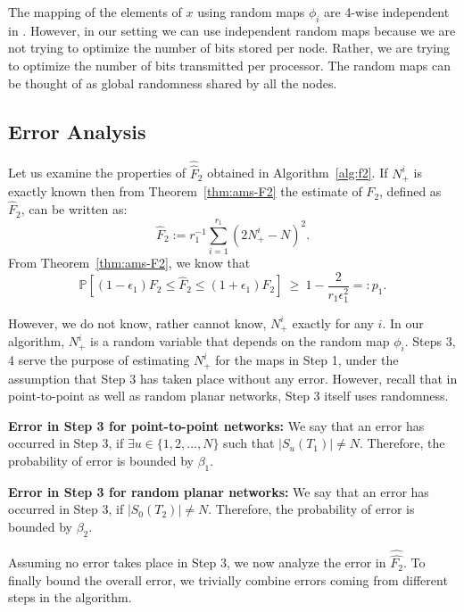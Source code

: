 \documentclass[10pt,twosided,a4paper,draft,onecolumn]{article}
\newcommand{\prob}[1]{\mathbb{P}\left[ #1 \right]}
\begin{document}
The mapping of the elements of $x$ using random maps $\phi_i$ are
4-wise independent in \cite{Alon96}. However, in our setting we can
use independent random maps because we are not trying to optimize the
number of bits stored per node. Rather, we are trying to optimize the
number of bits transmitted per processor. The random maps can be
thought of as global randomness shared by all the nodes.

\subsection{Error Analysis}
\label{sec:err-analysis}

Let us examine the properties of $\hat{\hat{F}}_2$ obtained in
Algorithm~\ref{alg:f2}. If $N_+^i$ is exactly known then
from Theorem~\ref{thm:ams-F2} the estimate of $F_2$, defined as
$\hat{F}_2$, can be written as:
\begin{displaymath}
  \hat{F}_2 := r_1^{-1} \sum\limits_{i=1}^{r_1} \left( 2N_{+}^i - N \right)^2.
\end{displaymath}
From Theorem~\ref{thm:ams-F2}, we know that 
\begin{equation}
  \label{eq:p1}
  \prob{(1-\epsilon_1)F_2 \leq \hat{F}_2 \leq (1+\epsilon_1)F_2}
  \ \geq \ 1-\frac{2}{r_1\epsilon_1^2} =: p_1.
\end{equation}


However, we do not know, rather cannot know, $N_+^i$ exactly for any
$i$. In our algorithm, $N_+^i$ is a random variable that depends on
the random map $\phi_i$. Steps 3, 4 serve the purpose of estimating
$N_+^i$ for the maps in Step 1, under the assumption that Step 3 has
taken place without any error.  However, recall that in point-to-point
as well as random planar networks, Step 3 itself uses randomness.

\textbf{Error in Step 3 for point-to-point networks:} We say that an
error has occurred in Step 3, if $\exists u \in \{1,2,\ldots,N\}$ such
that $|S_u(T_1)| \neq N$. Therefore, the probability of error is
bounded by $\beta_1.$

\textbf{Error in Step 3 for random planar networks:} We say that an
error has occurred in Step 3, if $|S_0(T_2)| \neq N$. Therefore, the
probability of error is bounded by $\beta_2.$

Assuming no error takes place in Step 3, we now analyze the error in
$\hat{\hat{F_2}}$. To finally bound the overall error, we trivially
combine errors coming from different steps in the algorithm.
\end{document}
